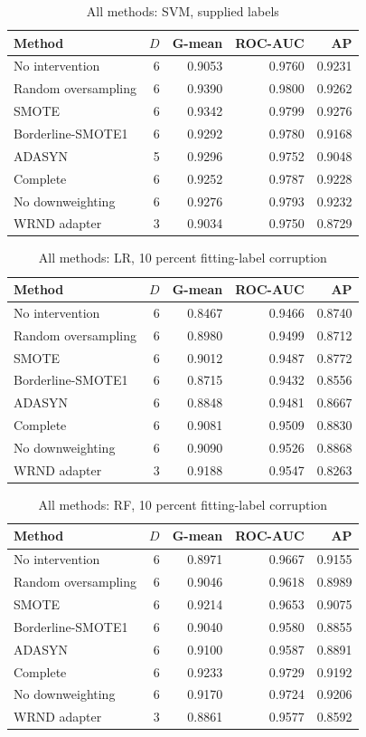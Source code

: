 \begin{table}[htbp]
\caption{All methods: SVM, supplied labels}
\centering\small
\begin{tabular}{lrrrr}
\hline
Method & $D$ & G-mean & ROC-AUC & AP\\
\hline
No intervention & 6 & 0.9053 & 0.9760 & 0.9231 \\
Random oversampling & 6 & 0.9390 & 0.9800 & 0.9262 \\
SMOTE & 6 & 0.9342 & 0.9799 & 0.9276 \\
Borderline-SMOTE1 & 6 & 0.9292 & 0.9780 & 0.9168 \\
ADASYN & 5 & 0.9296 & 0.9752 & 0.9048 \\
Complete & 6 & 0.9252 & 0.9787 & 0.9228 \\
No downweighting & 6 & 0.9276 & 0.9793 & 0.9232 \\
WRND adapter & 3 & 0.9034 & 0.9750 & 0.8729 \\
\hline
\end{tabular}
\end{table}
\begin{table}[htbp]
\caption{All methods: LR, 10 percent fitting-label corruption}
\centering\small
\begin{tabular}{lrrrr}
\hline
Method & $D$ & G-mean & ROC-AUC & AP\\
\hline
No intervention & 6 & 0.8467 & 0.9466 & 0.8740 \\
Random oversampling & 6 & 0.8980 & 0.9499 & 0.8712 \\
SMOTE & 6 & 0.9012 & 0.9487 & 0.8772 \\
Borderline-SMOTE1 & 6 & 0.8715 & 0.9432 & 0.8556 \\
ADASYN & 6 & 0.8848 & 0.9481 & 0.8667 \\
Complete & 6 & 0.9081 & 0.9509 & 0.8830 \\
No downweighting & 6 & 0.9090 & 0.9526 & 0.8868 \\
WRND adapter & 3 & 0.9188 & 0.9547 & 0.8263 \\
\hline
\end{tabular}
\end{table}
\begin{table}[htbp]
\caption{All methods: RF, 10 percent fitting-label corruption}
\centering\small
\begin{tabular}{lrrrr}
\hline
Method & $D$ & G-mean & ROC-AUC & AP\\
\hline
No intervention & 6 & 0.8971 & 0.9667 & 0.9155 \\
Random oversampling & 6 & 0.9046 & 0.9618 & 0.8989 \\
SMOTE & 6 & 0.9214 & 0.9653 & 0.9075 \\
Borderline-SMOTE1 & 6 & 0.9040 & 0.9580 & 0.8855 \\
ADASYN & 6 & 0.9100 & 0.9587 & 0.8891 \\
Complete & 6 & 0.9233 & 0.9729 & 0.9192 \\
No downweighting & 6 & 0.9170 & 0.9724 & 0.9206 \\
WRND adapter & 3 & 0.8861 & 0.9577 & 0.8592 \\
\hline
\end{tabular}
\end{table}

